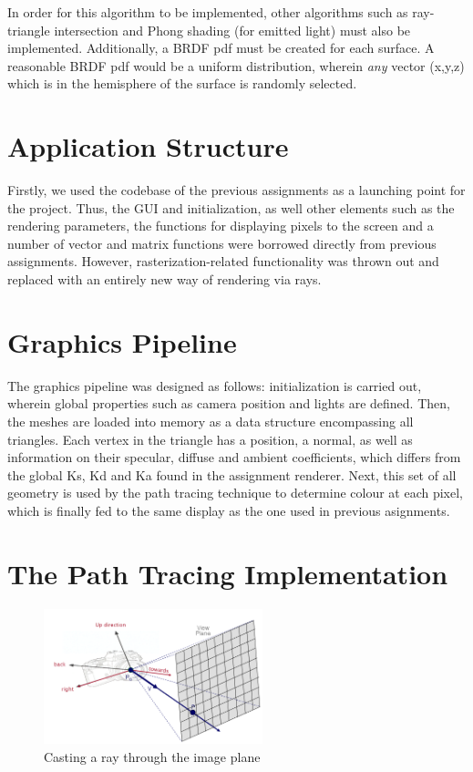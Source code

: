 \documentclass[journal]{IEEEtran}
\begin{document}
In order for this algorithm to be implemented, other algorithms such as ray-triangle intersection and Phong shading (for emitted light) must also be implemented. 
Additionally, a BRDF pdf must be created for each surface. A reasonable BRDF pdf would be a uniform distribution, wherein \emph{any} 
vector (x,y,z) which is in the hemisphere of the surface is randomly selected.

\section{Application Structure}
Firstly, we used the codebase of the previous assignments as a launching point for the project. Thus, the GUI and initialization, as well other elements such as the rendering parameters, the functions for displaying pixels to the screen and a number of vector and matrix functions were borrowed directly from previous assignments. However, rasterization-related functionality was thrown out and replaced with an entirely new way of rendering via rays.

\section{Graphics Pipeline}
The graphics pipeline was designed as follows: initialization is carried out, wherein global properties such as camera position and lights are defined. Then, the meshes are loaded into memory as a data structure encompassing all triangles. Each vertex in the triangle has a position, a normal, as well as information on their specular, diffuse and ambient coefficients, which differs from the global Ks, Kd and Ka found in the assignment renderer. Next, this set of all geometry is used by the path tracing technique to determine colour at each pixel, which is finally fed to the same display as the one used in previous asignments.

\section{The Path Tracing Implementation}

\begin{figure}[!t]

\centering
\includegraphics[width=2.5in]{raycast_viewplane}
\caption{Casting a ray through the image plane}
\label{raycast_viewplane}

\end{figure}
\end{document}
